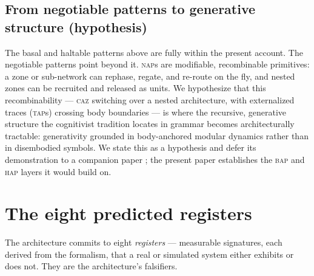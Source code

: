 \documentclass[utf8]{FrontiersinHarvard}
\newcommand{\caz}{\textsc{caz}}
\newcommand{\bap}{\textsc{bap}}
\newcommand{\hap}{\textsc{hap}}
\newcommand{\nap}{\textsc{nap}}
\newcommand{\tap}{\textsc{tap}}
\begin{document}
\subsection{From negotiable patterns to generative structure (hypothesis)}
The basal and haltable patterns above are fully within the present account. The negotiable patterns point beyond it. \nap{}s are modifiable, recombinable primitives: a zone or sub-network can rephase, regate, and re-route on the fly, and nested zones can be recruited and released as units. We hypothesize that this recombinability --- \caz{} switching over a nested architecture, with externalized traces (\tap{}s) crossing body boundaries --- is where the recursive, generative structure the cognitivist tradition locates in grammar \citep{chomsky1957syntactic} becomes architecturally tractable: generativity grounded in body-anchored modular dynamics rather than in disembodied symbols. We state this as a hypothesis and defer its demonstration to a companion paper \citep{NagarjunaKarnamNAPprep}; the present paper establishes the \bap{} and \hap{} layers it would build on.

\section{The eight predicted registers}\label{sec:registers}

The architecture commits to eight \emph{registers} --- measurable signatures, each derived from the formalism, that a real or simulated system either exhibits or does not. They are the architecture's falsifiers.
\end{document}
